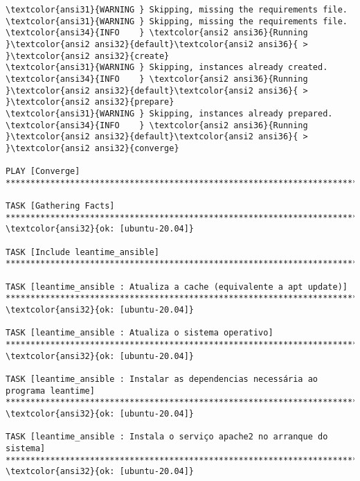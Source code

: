 \documentclass{scrartcl}
\begin{document}
\begin{Verbatim}
\textcolor{ansi31}{WARNING } Skipping, missing the requirements file.
\textcolor{ansi31}{WARNING } Skipping, missing the requirements file.
\textcolor{ansi34}{INFO    } \textcolor{ansi2 ansi36}{Running }\textcolor{ansi2 ansi32}{default}\textcolor{ansi2 ansi36}{ > }\textcolor{ansi2 ansi32}{create}
\textcolor{ansi31}{WARNING } Skipping, instances already created.
\textcolor{ansi34}{INFO    } \textcolor{ansi2 ansi36}{Running }\textcolor{ansi2 ansi32}{default}\textcolor{ansi2 ansi36}{ > }\textcolor{ansi2 ansi32}{prepare}
\textcolor{ansi31}{WARNING } Skipping, instances already prepared.
\textcolor{ansi34}{INFO    } \textcolor{ansi2 ansi36}{Running }\textcolor{ansi2 ansi32}{default}\textcolor{ansi2 ansi36}{ > }\textcolor{ansi2 ansi32}{converge}

PLAY [Converge] *****************************************************************************************************************************************************************************

TASK [Gathering Facts] **********************************************************************************************************************************************************************
\textcolor{ansi32}{ok: [ubuntu-20.04]}

TASK [Include leantime_ansible] *************************************************************************************************************************************************************

TASK [leantime_ansible : Atualiza a cache (equivalente a apt update)] ***********************************************************************************************************************
\textcolor{ansi32}{ok: [ubuntu-20.04]}

TASK [leantime_ansible : Atualiza o sistema operativo] **************************************************************************************************************************************
\textcolor{ansi32}{ok: [ubuntu-20.04]}

TASK [leantime_ansible : Instalar as dependencias necessária ao programa leantime] **********************************************************************************************************
\textcolor{ansi32}{ok: [ubuntu-20.04]}

TASK [leantime_ansible : Instala o serviço apache2 no arranque do sistema] ******************************************************************************************************************
\textcolor{ansi32}{ok: [ubuntu-20.04]}


\end{Verbatim}
\end{document}
